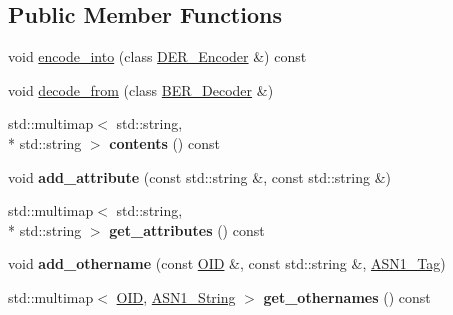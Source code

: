 \subsection*{Public Member Functions}
\begin{DoxyCompactItemize}
\item 
void \hyperlink{classBotan_1_1AlternativeName_a61562f25acad72f83989e513ef6e7e09}{encode\-\_\-into} (class \hyperlink{classBotan_1_1DER__Encoder}{D\-E\-R\-\_\-\-Encoder} \&) const 
\item 
void \hyperlink{classBotan_1_1AlternativeName_af99320f87ec35493ad0a9d42e8fce86a}{decode\-\_\-from} (class \hyperlink{classBotan_1_1BER__Decoder}{B\-E\-R\-\_\-\-Decoder} \&)
\item 
\hypertarget{classBotan_1_1AlternativeName_a43d52b97a9dbd49dd3aa41f0e716952c}{std\-::multimap$<$ std\-::string, \\*
std\-::string $>$ {\bfseries contents} () const }\label{classBotan_1_1AlternativeName_a43d52b97a9dbd49dd3aa41f0e716952c}

\item 
\hypertarget{classBotan_1_1AlternativeName_af6d4f9f939419ebc57c2ff63d5cd1bd3}{void {\bfseries add\-\_\-attribute} (const std\-::string \&, const std\-::string \&)}\label{classBotan_1_1AlternativeName_af6d4f9f939419ebc57c2ff63d5cd1bd3}

\item 
\hypertarget{classBotan_1_1AlternativeName_a5bd361ccfcd13609d41f7969b5d47279}{std\-::multimap$<$ std\-::string, \\*
std\-::string $>$ {\bfseries get\-\_\-attributes} () const }\label{classBotan_1_1AlternativeName_a5bd361ccfcd13609d41f7969b5d47279}

\item 
\hypertarget{classBotan_1_1AlternativeName_a9da9884c130e88615a7467a9660dcadc}{void {\bfseries add\-\_\-othername} (const \hyperlink{classBotan_1_1OID}{O\-I\-D} \&, const std\-::string \&, \hyperlink{namespaceBotan_aaa08f67a945ef195fa39e62659dffa7a}{A\-S\-N1\-\_\-\-Tag})}\label{classBotan_1_1AlternativeName_a9da9884c130e88615a7467a9660dcadc}

\item 
\hypertarget{classBotan_1_1AlternativeName_a50f9487f2c18387c49824d3233d04873}{std\-::multimap$<$ \hyperlink{classBotan_1_1OID}{O\-I\-D}, \hyperlink{classBotan_1_1ASN1__String}{A\-S\-N1\-\_\-\-String} $>$ {\bfseries get\-\_\-othernames} () const }\label{classBotan_1_1AlternativeName_a50f9487f2c18387c49824d3233d04873}


\end{DoxyCompactItemize}
